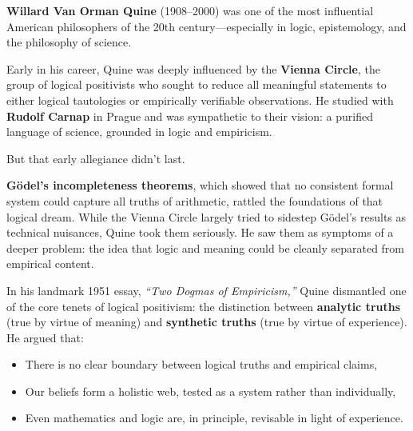 \begin{tcolorbox}[colback=gray!5!white, colframe=black!75!white, title={Historical Sidebar: W.V.O. Quine and the Death of the Analytic-Synthetic Divide}]

    \textbf{Willard Van Orman Quine} (1908–2000) was one of the most influential American philosophers of the 20th century—especially in logic, epistemology, and the philosophy of science.

    \medskip
    
    Early in his career, Quine was deeply influenced by the \textbf{Vienna Circle}, the group of logical positivists who sought to reduce all meaningful statements to either logical tautologies or empirically verifiable observations. He studied with \textbf{Rudolf Carnap} in Prague and was sympathetic to their vision: a purified language of science, grounded in logic and empiricism.

    \medskip
    
    But that early allegiance didn’t last.
    
    \medskip
    
    \textbf{Gödel’s incompleteness theorems}, which showed that no consistent formal system could capture all truths of arithmetic, rattled the foundations of that logical dream. While the Vienna Circle largely tried to sidestep Gödel’s results as technical nuisances, Quine took them seriously. He saw them as symptoms of a deeper problem: the idea that logic and meaning could be cleanly separated from empirical content.

    \medskip
    
    In his landmark 1951 essay, \textit{“Two Dogmas of Empiricism,”} Quine dismantled one of the core tenets of logical positivism: the distinction between \textbf{analytic truths} (true by virtue of meaning) and \textbf{synthetic truths} (true by virtue of experience). He argued that:

    \medskip
    
    
    \begin{itemize}
        \item There is no clear boundary between logical truths and empirical claims,
        \item Our beliefs form a holistic web, tested as a system rather than individually,
        \item Even mathematics and logic are, in principle, revisable in light of experience.
    \end{itemize}


\end{tcolorbox}
